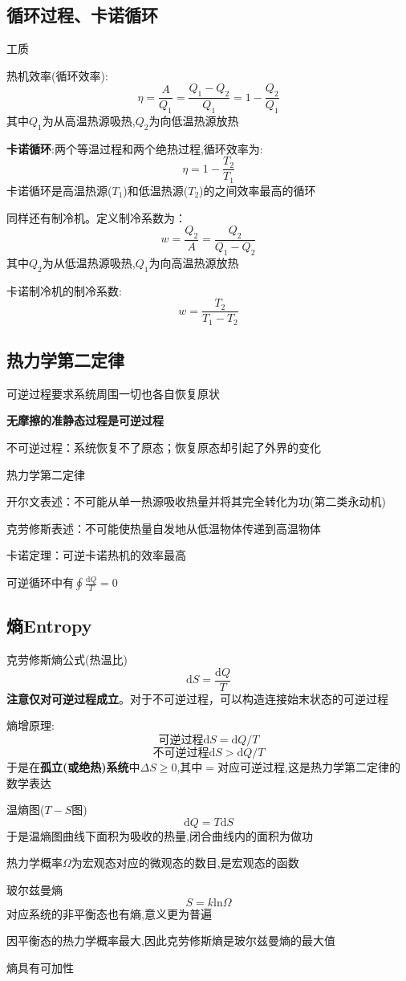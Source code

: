 \documentclass[10pt,a4paper]{article}
\begin{document}
\subsection{循环过程、卡诺循环}
工质

热机效率(循环效率):
\[\eta=\frac{A}{Q_1}=\frac{Q_1-Q_2}{Q_1}=1-\frac{Q_2}{Q_1}\]
其中$Q_1$为从高温热源吸热,$Q_2$为向低温热源放热

\textbf{卡诺循环}:两个等温过程和两个绝热过程,循环效率为:
\[\boxed{\eta=1-\frac{T_2}{T_1}}\]
卡诺循环是高温热源($T_1$)和低温热源($T_2$)的之间效率最高的循环

同样还有制冷机。定义制冷系数为：
\[w=\frac{Q_2}{A}=\frac{Q_2}{Q_1-Q_2}\]
其中$Q_2$为从低温热源吸热,$Q_1$为向高温热源放热

卡诺制冷机的制冷系数:
\[w=\frac{T_2}{T_1-T_2}\]
\subsection{热力学第二定律}
可逆过程要求系统周围一切也各自恢复原状

\textbf{无摩擦的准静态过程是可逆过程}

不可逆过程：系统恢复不了原态；恢复原态却引起了外界的变化

热力学第二定律

开尔文表述：不可能从单一热源吸收热量并将其完全转化为功(第二类永动机)

克劳修斯表述：不可能使热量自发地从低温物体传递到高温物体

卡诺定理：可逆卡诺热机的效率最高

可逆循环中有$\oint\frac{\mathrm{d}Q}{T}=0$
\subsection{熵Entropy}
克劳修斯熵公式(热温比)
\[\mathrm{d}S=\frac{\mathrm{d}Q}{T}\]
\textbf{注意仅对可逆过程成立}。对于不可逆过程，可以构造连接始末状态的可逆过程

熵增原理:
\[\text{可逆过程}\mathrm{d}S=\mathrm{d}Q/T\]
\[\text{不可逆过程}\mathrm{d}S>\mathrm{d}Q/T\]
于是在\textbf{孤立(或绝热)系统}中$\Delta S\geq 0$,其中$=$对应可逆过程,这是热力学第二定律的数学表达

温熵图($T-S$图)
\[\mathrm{d}Q=T\mathrm{d}S\]
于是温熵图曲线下面积为吸收的热量,闭合曲线内的面积为做功

热力学概率$\Omega$为宏观态对应的微观态的数目,是宏观态的函数

玻尔兹曼熵
\[S=k\mathrm{ln}\Omega\]
对应系统的非平衡态也有熵,意义更为普遍

因平衡态的热力学概率最大,因此克劳修斯熵是玻尔兹曼熵的最大值

熵具有可加性
\end{document}
